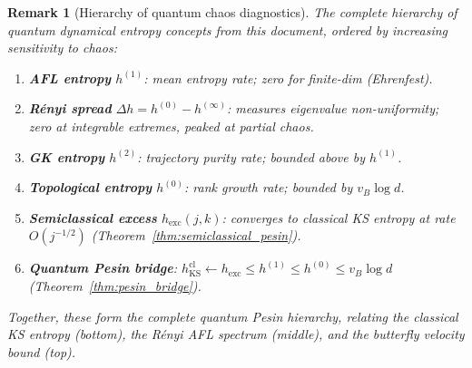 \documentclass[12pt,a4paper]{article}
\newtheorem{remark}[theorem]{Remark}
\begin{document}
\begin{remark}[Hierarchy of quantum chaos diagnostics]
  The complete hierarchy of quantum dynamical entropy concepts from this
  document, ordered by increasing sensitivity to chaos:
  \begin{enumerate}
    \item \textbf{AFL entropy} $h^{(1)}$: mean entropy rate; zero for finite-dim (Ehrenfest).
    \item \textbf{Rényi spread} $\Delta h = h^{(0)}-h^{(\infty)}$: measures eigenvalue
      non-uniformity; zero at integrable extremes, peaked at partial chaos.
    \item \textbf{GK entropy} $h^{(2)}$: trajectory purity rate; bounded above by $h^{(1)}$.
    \item \textbf{Topological entropy} $h^{(0)}$: rank growth rate; bounded by $v_B\log d$.
    \item \textbf{Semiclassical excess} $h_{\mathrm{exc}}(j,k)$: converges to classical
      KS entropy at rate $O(j^{-1/2})$ (Theorem~\ref{thm:semiclassical_pesin}).
    \item \textbf{Quantum Pesin bridge}: $h_{\mathrm{KS}}^{\mathrm{cl}} \leftarrow h_{\mathrm{exc}}
      \leq h^{(1)} \leq h^{(0)} \leq v_B\log d$ (Theorem~\ref{thm:pesin_bridge}).
  \end{enumerate}
  Together, these form the complete quantum Pesin hierarchy, relating the
  classical KS entropy (bottom), the Rényi AFL spectrum (middle), and the
  butterfly velocity bound (top).
\end{remark}
\end{document}
